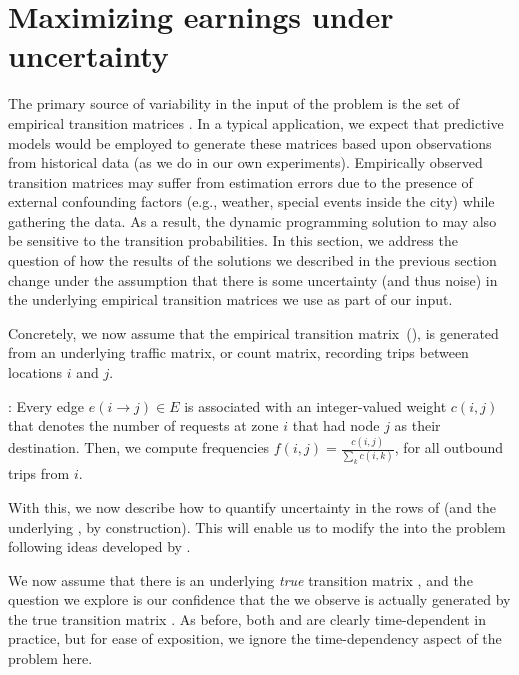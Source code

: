 

\section{Maximizing earnings under uncertainty}
\label{sec:sensitivity}
The primary source of variability in the input of the {\originalproblem} problem
is the set of empirical transition matrices {\empiricaltransitionmatrix}.  In a typical application,
we expect that predictive models would be employed to generate these matrices based upon observations
from historical data (as we do in our own experiments).  Empirically observed transition matrices may 
suffer from estimation errors due to the presence of external confounding factors (e.g., 
weather, special 
events inside the city) while gathering the data. As a result, the dynamic programming solution 
to {\originalproblem}  may also be sensitive to the transition probabilities. In this section, 
we address the question of how the results of the solutions we described in the previous section change 
under the assumption that there is some uncertainty (and thus noise) in the underlying empirical transition 
matrices we use as part of our input.

Concretely, we now assume that the empirical transition matrix~(\empiricaltransitionmatrix),  is generated from an 
underlying traffic matrix, or count matrix, recording trips between locations $i$ and $j$.

:
Every edge $e(i\rightarrow j) \in E$ is associated with an
integer-valued weight $c(i,j)$ that denotes the number of requests
at zone $i$ that had node $j$ as their destination.
Then, we compute frequencies $f(i,j) = \frac{c(i,j)}{\sum_k c(i,k)}$, for all outbound trips from $i$.

With this, we now describe how to quantify uncertainty in the rows of {\empiricaltransitionmatrix} 
(and the underlying {\countmatrix}, by construction). This will enable us to  
modify the {\originalproblem} into the {\robustproblem} problem following ideas developed
by \citet{nilim2004robustness}.



We now assume that there is an underlying \emph{true} transition matrix
{\truetransitionmatrix}, and the question we explore is 
our confidence that the
{\countmatrix} we observe is actually 
generated by the true transition matrix {\truetransitionmatrix}.  As before, both 
{\truetransitionmatrix} and {\countmatrix} are clearly time-dependent in practice,
but for ease of exposition, we ignore the time-dependency aspect of the problem here.

